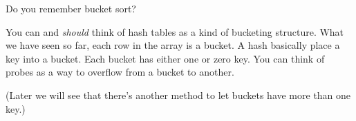 
Do you remember bucket sort?

You can and \textit{should} think of hash tables
as a kind of bucketing structure.
What we have seen so far, each row in the array is a bucket.
A hash basically place a key into a bucket.
Each bucket has either one or zero key.
You can think of probes as a way to overflow from a bucket to another.

(Later we will see that there's another method to let buckets
have more than one key.)
\newpage
